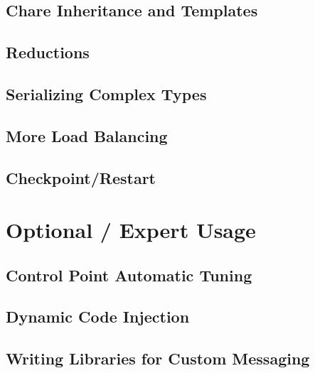 \documentclass[10pt]{report}
\begin{document}
\chapter{Chare Inheritance and Templates}
\label{inheritance and templates}
  

\chapter{Reductions}
  
  

\chapter{Serializing Complex Types}
  

\chapter{More Load Balancing}
  

\chapter{Checkpoint/Restart}
\label{sec:checkpoint}
  

      
%  


\part{Optional / Expert Usage}

\chapter{Control Point Automatic Tuning}
\label{sec:controlpoint}
  

\chapter{Dynamic Code Injection}
\label{python}
  

\chapter{Writing Libraries for Custom Messaging}
  

%
\end{document}

